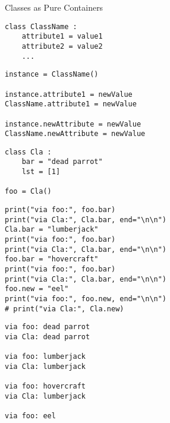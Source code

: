 \begin{frame}[fragile]{Classes as Pure Containers}
%
\begin{codebox}
\begin{verbatim}
class ClassName :
    attribute1 = value1
    attribute2 = value2
    ...
\end{verbatim}
\end{codebox}
%
\begin{codebox}
\begin{verbatim}
instance = ClassName()

instance.attribute1 = newValue
ClassName.attribute1 = newValue

instance.newAttribute = newValue
ClassName.newAttribute = newValue
\end{verbatim}
\end{codebox}
%
\end{frame}


\begin{frame}[fragile]
%
\vspace{-5pt}
\begin{codebox}
\begin{verbatim}
class Cla :
    bar = "dead parrot"
    lst = [1]

foo = Cla()
\end{verbatim}
\end{codebox}
%
\vspace{-8pt}
\begin{tcbraster}[raster columns=2,
                  raster equal height,
                  nobeforeafter,
                  raster column skip=0.2cm]
\begin{codebox}[(... continued ...)]
\begin{verbatim}
print("via foo:", foo.bar)
print("via Cla:", Cla.bar, end="\n\n")
Cla.bar = "lumberjack"
print("via foo:", foo.bar)
print("via Cla:", Cla.bar, end="\n\n")
foo.bar = "hovercraft"
print("via foo:", foo.bar)
print("via Cla:", Cla.bar, end="\n\n")
foo.new = "eel"
print("via foo:", foo.new, end="\n\n")
# print("via Cla:", Cla.new)
\end{verbatim}
\end{codebox}
%
\begin{cmdbox}
\begin{verbatim}
via foo: dead parrot
via Cla: dead parrot

via foo: lumberjack
via Cla: lumberjack

via foo: hovercraft
via Cla: lumberjack

via foo: eel
\end{verbatim}
\end{cmdbox}
\end{tcbraster}
%
\end{frame}

